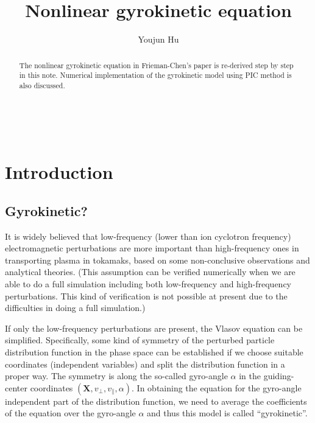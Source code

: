 \documentclass{llncs}
\begin{document}
\

\title{Nonlinear gyrokinetic equation}

\author{Youjun Hu}


\maketitle

\begin{abstract}
  The nonlinear gyrokinetic equation in Frieman-Chen's
  paper{\cite{frieman1982}} is re-derived step by step in this note. Numerical
  implementation of the gyrokinetic model using PIC method is also discussed.
\end{abstract}

\section{Introduction}

\subsection{Gyrokinetic?}

It is widely believed that low-frequency (lower than ion cyclotron frequency)
electromagnetic perturbations are more important than high-frequency ones in
transporting plasma in tokamaks, based on some non-conclusive observations and
analytical theories. (This assumption can be verified numerically when we are
able to do a full simulation including both low-frequency and high-frequency
perturbations. This kind of verification is not possible at present due to the
difficulties in doing a full simulation.)

If only the low-frequency perturbations are present, the Vlasov equation can
be simplified. Specifically, some kind of symmetry of the perturbed particle
distribution function in the phase space can be established if we choose
suitable coordinates (independent variables) and split the distribution
function in a proper way. The symmetry is along the so-called gyro-angle
$\alpha$ in the guiding-center coordinates $(\mathbf{X}, v_{\perp},
v_{\parallel}, \alpha)$. In obtaining the equation for the gyro-angle
independent part of the distribution function, we need to average the
coefficients of the equation over the gyro-angle $\alpha$ and thus this model
is called ``gyrokinetic''.
\end{document}
